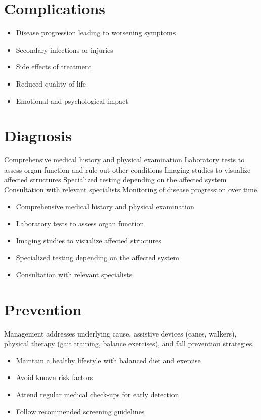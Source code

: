 \section{Complications}
\begin{itemize}[noitemsep]
  \item Disease progression leading to worsening symptoms
  \item Secondary infections or injuries
  \item Side effects of treatment
  \item Reduced quality of life
  \item Emotional and psychological impact
\end{itemize}
\section{Diagnosis}
Comprehensive medical history and physical examination Laboratory tests to assess organ function and rule out other conditions Imaging studies to visualize affected structures Specialized testing depending on the affected system Consultation with relevant specialists Monitoring of disease progression over time

\begin{itemize}[noitemsep]
  \item Comprehensive medical history and physical examination
  \item Laboratory tests to assess organ function
  \item Imaging studies to visualize affected structures
  \item Specialized testing depending on the affected system
  \item Consultation with relevant specialists
\end{itemize}
\section{Prevention}
Management addresses underlying cause, assistive devices (canes, walkers), physical therapy (gait training, balance exercises), and fall prevention strategies.

\begin{itemize}[noitemsep]
  \item Maintain a healthy lifestyle with balanced diet and exercise
  \item Avoid known risk factors
  \item Attend regular medical check-ups for early detection
  \item Follow recommended screening guidelines
\end{itemize}
